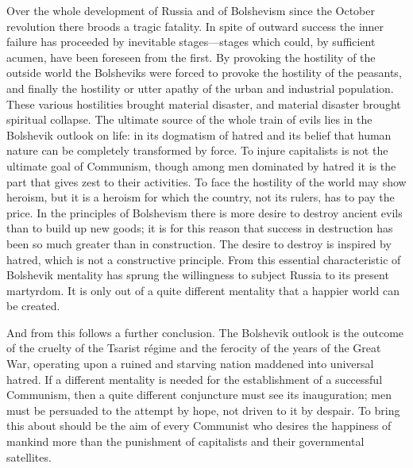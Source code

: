 Over the whole development of Russia and of Bolshevism since the October revolution there broods a tragic fatality. In spite of outward success the inner failure has proceeded by inevitable stages---stages which could, by sufficient acumen, have been foreseen from the first. By provoking the hostility of the outside world the Bolsheviks were forced to provoke the hostility of the peasants, and finally the hostility or utter apathy of the urban and industrial population. These various hostilities brought material disaster, and material disaster brought spiritual collapse. The ultimate source of the whole train of evils lies in the Bolshevik outlook on life: in its dogmatism of hatred and its belief that human nature can be completely transformed by force. To injure capitalists is not the ultimate goal of Communism, though among men dominated by hatred it is the part that gives zest to their activities. To face the hostility of the world may show heroism, but it is a heroism for which the country, not its rulers, has to pay the price. In the principles of Bolshevism there is more desire to destroy ancient evils than to build up new goods; it is for this reason that success in destruction has been so much greater than in construction. The desire to destroy is inspired by hatred, which is not a constructive principle. From this essential characteristic of Bolshevik mentality has sprung the willingness to subject Russia to its present martyrdom. It is only out of a quite different mentality that a happier world can be created.

And from this follows a further conclusion. The Bolshevik outlook is the outcome of the cruelty of the Tsarist régime and the ferocity of the years of the Great War, operating upon a ruined and starving nation maddened into universal hatred. If a different mentality is needed for the establishment of a successful Communism, then a quite different conjuncture must see its inauguration; men must be persuaded to the attempt by hope, not driven to it by despair. To bring this about should be the aim of every Communist who desires the happiness of mankind more than the punishment of capitalists and their governmental satellites.